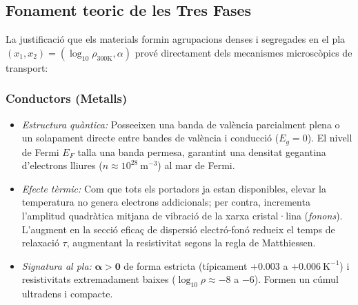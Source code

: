 \documentclass[a4paper,11pt]{article}
\begin{document}
\subsection{Fonament teoric de les Tres Fases}

La justificació que els materials formin agrupacions denses i segregades en el pla $(x_1, x_2) = (\log_{10}\rho_{300\mathrm{K}}, \alpha)$ prové directament dels mecanismes microscòpics de transport:

\subsubsection{Conductors (Metalls)}
\label{sec:conductors}
\begin{itemize}
    \item \emph{Estructura quàntica:} Posseeixen una banda de valència parcialment plena o un solapament directe entre bandes de valència i conducció ($E_g = 0$). El nivell de Fermi $E_F$ talla una banda permesa, garantint una densitat gegantina d'electrons lliures ($n \approx 10^{28}\ \text{m}^{-3}$) al mar de Fermi.
    \item \emph{Efecte tèrmic:} Com que tots els portadors ja estan disponibles, elevar la temperatura no genera electrons addicionals; per contra, incrementa l'amplitud quadràtica mitjana de vibració de la xarxa cristal·lina (\emph{fonons}). L'augment en la secció eficaç de dispersió electró-fonó redueix el temps de relaxació $\tau$, augmentant la resistivitat segons la regla de Matthiessen.
    \item \emph{Signatura al pla:} $\mathbf{\alpha > 0}$ de forma estricta (típicament $+0.003$ a $+0.006\ \text{K}^{-1}$) i resistivitats extremadament baixes ($\log_{10}\rho \approx -8$ a $-6$). Formen un cúmul ultradens i compacte.
\end{itemize}
\end{document}
